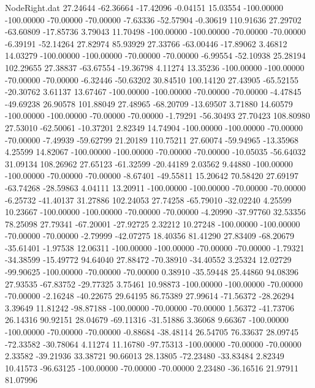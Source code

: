 \begin{filecontents}{NodeRight.dat}
  27.24644  -62.36664  -17.42096    -0.04151   15.03554 -100.00000 -100.00000  -70.00000  -70.00000   -7.63336  -52.57904   -0.30619  110.91636
  27.29702  -63.60809  -17.85736     3.79043   11.70498 -100.00000 -100.00000  -70.00000  -70.00000   -6.39191  -52.14264   27.82974   85.93929
  27.33766  -63.00446  -17.89062     3.46812   14.03279 -100.00000 -100.00000  -70.00000  -70.00000   -6.99554  -52.10938   25.28194  102.29655
  27.38837  -63.67554  -19.36798     4.11274   13.35236 -100.00000 -100.00000  -70.00000  -70.00000   -6.32446  -50.63202   30.84510  100.14120
  27.43905  -65.52155  -20.30762     3.61137   13.67467 -100.00000 -100.00000  -70.00000  -70.00000   -4.47845  -49.69238   26.90578  101.88049
  27.48965  -68.20709  -13.69507     3.71880   14.60579 -100.00000 -100.00000  -70.00000  -70.00000   -1.79291  -56.30493   27.70423  108.80980
  27.53010  -62.50061  -10.37201     2.82349   14.74904 -100.00000 -100.00000  -70.00000  -70.00000   -7.49939  -59.62799   21.20189  110.75211
  27.60074  -59.94965  -13.35968     4.25599   14.82067 -100.00000 -100.00000  -70.00000  -70.00000  -10.05035  -56.64032   31.09134  108.26962
  27.65123  -61.32599  -20.44189     2.03562    9.44880 -100.00000 -100.00000  -70.00000  -70.00000   -8.67401  -49.55811   15.20642   70.58420
  27.69197  -63.74268  -28.59863     4.04111   13.20911 -100.00000 -100.00000  -70.00000  -70.00000   -6.25732  -41.40137   31.27886  102.24053
  27.74258  -65.79010  -32.02240     4.25599   10.23667 -100.00000 -100.00000  -70.00000  -70.00000   -4.20990  -37.97760   32.53356   78.25098
  27.79341  -67.20001  -27.92725     2.32212   10.27248 -100.00000 -100.00000  -70.00000  -70.00000   -2.79999  -42.07275   18.40356   81.41290
  27.83409  -68.20679  -35.61401    -1.97538   12.06311 -100.00000 -100.00000  -70.00000  -70.00000   -1.79321  -34.38599  -15.49772   94.64040
  27.88472  -70.38910  -34.40552     3.25324   12.02729  -99.90625 -100.00000  -70.00000  -70.00000    0.38910  -35.59448   25.44860   94.08396
  27.93535  -67.83752  -29.77325     3.75461   10.98873 -100.00000 -100.00000  -70.00000  -70.00000   -2.16248  -40.22675   29.64195   86.75389
  27.99614  -71.56372  -28.26294     3.39649   11.81242  -98.87188 -100.00000  -70.00000  -70.00000    1.56372  -41.73706   26.14316   90.92151
  28.04679  -69.11316  -31.51886     3.36068    9.66367 -100.00000 -100.00000  -70.00000  -70.00000   -0.88684  -38.48114   26.54705   76.33637
  28.09745  -72.33582  -30.78064     4.11274   11.16780  -97.75313 -100.00000  -70.00000  -70.00000    2.33582  -39.21936   33.38721   90.66013
  28.13805  -72.23480  -33.83484     2.82349   10.41573  -96.63125 -100.00000  -70.00000  -70.00000    2.23480  -36.16516   21.97911   81.07996

\end{filecontents}
